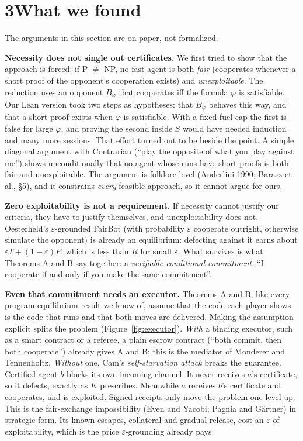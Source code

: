 \documentclass[11pt]{article}
\begin{document}
\section*{3\quad What we found}

The arguments in this section are on paper, not formalized.

\textbf{Necessity does not single out certificates.} We first tried to show that the approach is forced: if P $\neq$ NP, no fast agent is both \emph{fair} (cooperates whenever a short proof of the opponent's cooperation exists) and \emph{unexploitable}. The reduction uses an opponent $B_\varphi$ that cooperates iff the formula $\varphi$ is satisfiable. Our Lean version took two steps as hypotheses: that $B_\varphi$ behaves this way, and that a short proof exists when $\varphi$ is satisfiable. With a fixed fuel cap the first is false for large $\varphi$, and proving the second inside $S$ would have needed induction and many more sessions. That effort turned out to be beside the point. A simple diagonal argument with Contrarian (``play the opposite of what you play against me'') shows unconditionally that no agent whose runs have short proofs is both fair and unexploitable. The argument is folklore-level (Anderlini 1990; Barasz et al., \S5), and it constrains \emph{every} feasible approach, so it cannot argue for ours.

\textbf{Zero exploitability is not a requirement.} If necessity cannot justify our criteria, they have to justify themselves, and unexploitability does not. Oesterheld's $\varepsilon$-grounded FairBot (with probability $\varepsilon$ cooperate outright, otherwise simulate the opponent) is already an equilibrium: defecting against it earns about $\varepsilon T + (1-\varepsilon)P$, which is less than $R$ for small $\varepsilon$. What survives is what Theorems A and B say together: a \emph{verifiable conditional commitment}, ``I cooperate if and only if you make the same commitment''.

\textbf{Even that commitment needs an executor.} Theorems A and B, like every program-equilibrium result we know of, assume that the code each player shows is the code that runs and that both moves are delivered. Making the assumption explicit splits the problem (Figure~\ref{fig:executor}). \emph{With} a binding executor, such as a smart contract or a referee, a plain escrow contract (``both commit, then both cooperate'') already gives A and B; this is the mediator of Monderer and Tennenholtz. \emph{Without} one, Cam's \emph{self-starvation attack} breaks the guarantee. Certified agent $b$ blocks its own incoming channel. It never receives $a$'s certificate, so it defects, exactly as $K$ prescribes. Meanwhile $a$ receives $b$'s certificate and cooperates, and is exploited. Signed receipts only move the problem one level up. This is the fair-exchange impossibility (Even and Yacobi; Pagnia and Gärtner) in strategic form. Its known escapes, collateral and gradual release, cost an $\varepsilon$ of exploitability, which is the price $\varepsilon$-grounding already pays.
\end{document}
